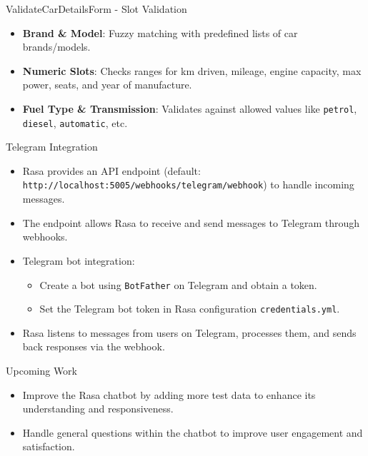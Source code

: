\documentclass{beamer}
\begin{document}
\begin{frame}{ValidateCarDetailsForm - Slot Validation}
	\begin{itemize}
		\item \textbf{Brand \& Model}: Fuzzy matching with predefined lists of car brands/models.
		\item \textbf{Numeric Slots}: Checks ranges for km driven, mileage, engine capacity, max power, seats, and year of manufacture.
		\item \textbf{Fuel Type \& Transmission}: Validates against allowed values like \texttt{petrol}, \texttt{diesel}, \texttt{automatic}, etc.
	\end{itemize}
\end{frame}

\begin{frame}{Telegram Integration}
	
	\begin{itemize}
		\item Rasa provides an API endpoint (default: \texttt{http://localhost:5005/webhooks/telegram/webhook}) to handle incoming messages.
		\item The endpoint allows Rasa to receive and send messages to Telegram through webhooks.
		\item Telegram bot integration:
		\begin{itemize}
			\item Create a bot using \texttt{BotFather} on Telegram and obtain a token.
			\item Set the Telegram bot token in Rasa configuration \texttt{credentials.yml}.
		\end{itemize}
		\item Rasa listens to messages from users on Telegram, processes them, and sends back responses via the webhook.
	\end{itemize}
	
\end{frame}

\begin{frame}{Upcoming Work}
    \begin{itemize}
        \item Improve the Rasa chatbot by adding more test data to enhance its understanding and responsiveness.
        \item Handle general questions within the chatbot to improve user engagement and satisfaction.
    \end{itemize}
\end{frame}
\end{document}
